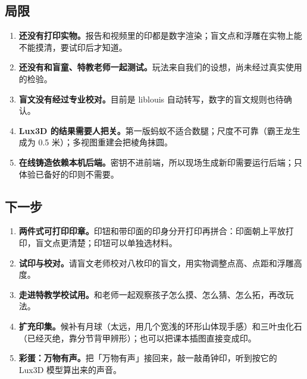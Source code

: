 \documentclass[UTF8,a4paper,zihao=5,fontset=none]{ctexart}
\begin{document}
\subsection{局限}
\begin{enumerate}[leftmargin=1.6em,itemsep=3pt]
  \item \textbf{还没有打印实物。}报告和视频里的印都是数字渲染；盲文点和浮雕在实物上能不能摸清，要试印后才知道。
  \item \textbf{还没有和盲童、特教老师一起测试。}玩法来自我们的设想，尚未经过真实使用的检验。
  \item \textbf{盲文没有经过专业校对。}目前是 liblouis 自动转写，数字的盲文规则也待确认。
  \item \textbf{Lux3D 的结果需要人把关。}第一版蚂蚁不适合数腿；尺度不可靠（霸王龙生成为 0.5 米）；多视图重建会把棱角抹圆。
  \item \textbf{在线铸造依赖本机后端。}密钥不进前端，所以现场生成新印需要运行后端；只体验已备好的印则不需要。
\end{enumerate}

\subsection{下一步}
\begin{enumerate}[leftmargin=1.6em,itemsep=3pt]
  \item \textbf{两件式可打印印章。}印钮和带印面的印身分开打印再拼合：印面朝上平放打印，盲文点更清楚；印钮可以单独选材料。
  \item \textbf{试印与校对。}请盲文老师校对八枚印的盲文，用实物调整点高、点距和浮雕高度。
  \item \textbf{走进特教学校试用。}和老师一起观察孩子怎么摸、怎么猜、怎么拓，再改玩法。
  \item \textbf{扩充印集。}候补有月球（太远，用几个宽浅的环形山体现手感）和三叶虫化石（已经灭绝，靠分节背甲辨形）；也可以把课本插图直接变成印。
  \item \textbf{彩蛋：万物有声。}把「万物有声」接回来，敲一敲甬钟印，听到按它的 Lux3D 模型算出来的声音。
\end{enumerate}

\end{document}
